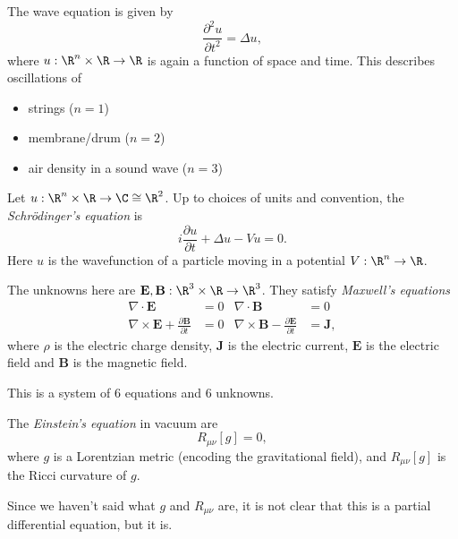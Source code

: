 \documentclass[a4paper]{article}
\begin{document}
\begin{eg}
  The wave equation is given by
  \[
    \frac{\partial^2 u}{\partial t^2} = \Delta u,
  \]
  where $u: \R^n \times \R \to \R$ is again a function of space and time. This describes oscillations of
  \begin{itemize}
    \item strings ($n = 1$)
    \item membrane/drum ($n = 2$)
    \item air density in a sound wave ($n = 3$)
  \end{itemize}
\end{eg}

\begin{eg}
  Let $u: \R^n \times \R \to \C \cong \R^2$. Up to choices of units and convention, the \emph{Schr\"odinger's equation} is
  \[
    i\frac{\partial u}{\partial t} + \Delta u - Vu = 0.
  \]
  Here $u$ is the wavefunction of a particle moving in a potential $V: \R^n \to \R$.
\end{eg}

\begin{eg}
  The unknowns here are $\mathbf{E}, \mathbf{B}: \R^3 \times \R \to \R^3$. They satisfy \emph{Maxwell's equations}
  \begin{align*}
    \nabla \cdot \mathbf{E} &= 0 & \nabla \cdot \mathbf{B} &= 0\\
    \nabla \times \mathbf{E} + \frac{\partial \mathbf{B}}{\partial t} &= 0 & \nabla \times \mathbf{B} - \frac{\partial \mathbf{E}}{\partial t} &= \mathbf{J},
  \end{align*}
  where $\rho$ is the electric charge density, $\mathbf{J}$ is the electric current, $\mathbf{E}$ is the electric field and $\mathbf{B}$ is the magnetic field.

  This is a system of 6 equations and 6 unknowns.
\end{eg}

\begin{eg}
  The \emph{Einstein's equation} in vacuum are
  \[
    R_{\mu\nu}[g] = 0,
  \]
  where $g$ is a Lorentzian metric (encoding the gravitational field), and $R_{\mu\nu}[g]$ is the Ricci curvature of $g$.

  Since we haven't said what $g$ and $R_{\mu\nu}$ are, it is not clear that this is a partial differential equation, but it is.
\end{eg}
\end{document}
